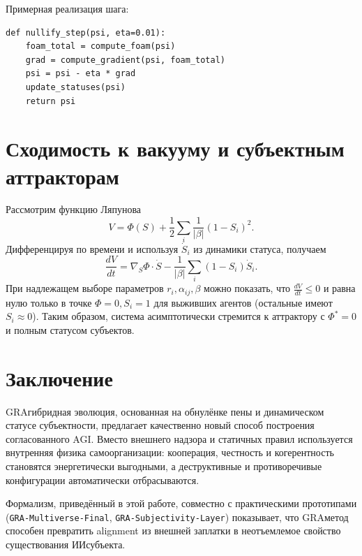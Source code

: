 \documentclass[11pt,a4paper]{article}
\begin{document}
Примерная реализация шага:
\begin{verbatim}
def nullify_step(psi, eta=0.01):
    foam_total = compute_foam(psi)
    grad = compute_gradient(psi, foam_total)
    psi = psi - eta * grad
    update_statuses(psi)
    return psi
\end{verbatim}

\section{Сходимость к вакууму и субъектным аттракторам}

Рассмотрим функцию Ляпунова
\begin{equation}
V = \Phi(S) + \frac{1}{2}\sum_i \frac{1}{|\beta|} (1 - S_i)^2.
\end{equation}
Дифференцируя по времени и используя $\dot S_i$ из динамики статуса, получаем
\begin{equation}
\frac{dV}{dt} = \nabla_S\Phi \cdot \dot S - \frac{1}{|\beta|}\sum_i (1-S_i)\dot S_i.
\end{equation}
При надлежащем выборе параметров $r_i, \alpha_{ij}, \beta$ можно показать, что $\frac{dV}{dt}\le 0$ и равна нулю только в точке $\Phi=0, S_i=1$ для выживших агентов (остальные имеют $S_i\approx 0$).
Таким образом, система асимптотически стремится к аттрактору с $\Phi^*=0$ и полным статусом субъектов.

\section{Заключение}

GRA\textendash гибридная эволюция, основанная на обнулёнке пены и динамическом статусе субъектности, предлагает качественно новый способ построения согласованного AGI.
Вместо внешнего надзора и статичных правил используется внутренняя физика самоорганизации: кооперация, честность и когерентность становятся энергетически выгодными, а деструктивные и противоречивые конфигурации автоматически отбрасываются.

Формализм, приведённый в этой работе, совместно с практическими прототипами (\texttt{GRA-Multiverse-Final}, \texttt{GRA-Subjectivity-Layer}) показывает, что GRA\textendash метод способен превратить alignment из внешней заплатки в неотъемлемое свойство существования ИИ\textendash субъекта.


\end{document}
